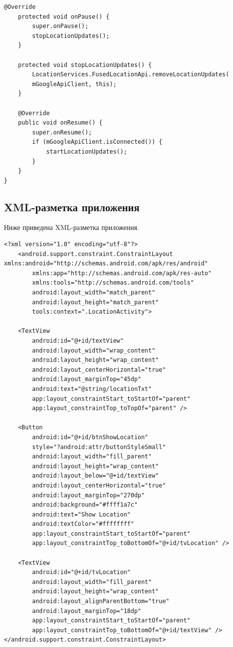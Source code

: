 \documentclass[a4paper,12pt]{article}
\begin{document}
\begin{lstlisting}[caption=Основной код прилжения из LocationActivity.java]
	@Override
	protected void onPause() {
		super.onPause();
		stopLocationUpdates();
	}
	
	protected void stopLocationUpdates() {
		LocationServices.FusedLocationApi.removeLocationUpdates(
		mGoogleApiClient, this);
	}
	
	@Override
	public void onResume() {
		super.onResume();
		if (mGoogleApiClient.isConnected()) {
			startLocationUpdates();
		}
	}
}
\end{lstlisting}

\subsection{XML-разметка приложения}

Ниже приведена XML-разметка приложения.



\begin{lstlisting}[caption=Разметка прилжения из activity\_location.xml]
<?xml version="1.0" encoding="utf-8"?>
	<android.support.constraint.ConstraintLayout xmlns:android="http://schemas.android.com/apk/res/android"
		xmlns:app="http://schemas.android.com/apk/res-auto"
		xmlns:tools="http://schemas.android.com/tools"
		android:layout_width="match_parent"
		android:layout_height="match_parent"
		tools:context=".LocationActivity">
	
	<TextView
		android:id="@+id/textView"
		android:layout_width="wrap_content"
		android:layout_height="wrap_content"
		android:layout_centerHorizontal="true"
		android:layout_marginTop="45dp"
		android:text="@string/locationTxt"
		app:layout_constraintStart_toStartOf="parent"
		app:layout_constraintTop_toTopOf="parent" />
	
	<Button
		android:id="@+id/btnShowLocation"
		style="?android:attr/buttonStyleSmall"
		android:layout_width="fill_parent"
		android:layout_height="wrap_content"
		android:layout_below="@+id/textView"
		android:layout_centerHorizontal="true"
		android:layout_marginTop="270dp"
		android:background="#ffff1a7c"
		android:text="Show Location"
		android:textColor="#ffffffff"
		app:layout_constraintStart_toStartOf="parent"
		app:layout_constraintTop_toBottomOf="@+id/tvLocation" />
	
	<TextView
		android:id="@+id/tvLocation"
		android:layout_width="fill_parent"
		android:layout_height="wrap_content"
		android:layout_alignParentBottom="true"
		android:layout_marginTop="18dp"
		app:layout_constraintStart_toStartOf="parent"
		app:layout_constraintTop_toBottomOf="@+id/textView" />
</android.support.constraint.ConstraintLayout>
\end{lstlisting}
\end{document}
